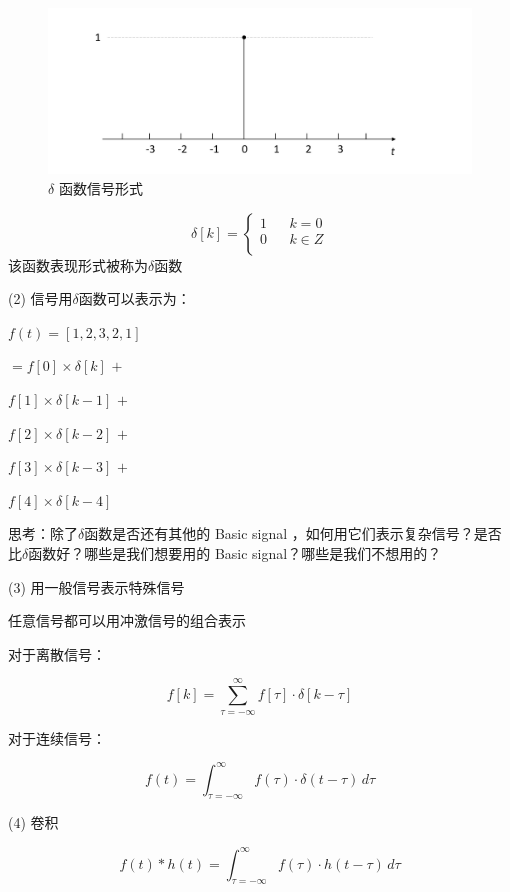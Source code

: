 \documentclass[UTF8]{ctexart}
\begin{document}
\begin{figure}[h]
    \centering         %
    \includegraphics[scale=0.4]{1.png}
    \caption{$\delta $ 函数信号形式}
\end{figure}
\[  \delta [ k] =\left\{ \begin{array}{rcl}
    1 & & {k =0}\\
    0 & & {k\in Z}\\
    \end{array} \right. \]
该函数表现形式被称为$\delta$函数\par
(2) \; 信号用$\delta$函数可以表示为：\par
$f(t)=[ 1,2,3,2,1]  $ \par
\qquad $=f[0]\times \delta [ k]  $ \quad \;  $+$\par
\qquad \quad $ f[1]\times \delta [ k-1]  $  $+$\par
\qquad \quad $ f[2]\times \delta [ k-2]  $  $+$\par
\qquad \quad $ f[3]\times \delta [ k-3]  $  $+$\par
\qquad \quad $ f[4]\times \delta [ k-4]  $  \par
思考：除了$\delta$函数是否还有其他的 Basic signal ，如何用它们表示复杂信号？是否比$\delta$函数好？哪些是我们想要用的 Basic signal？哪些是我们不想用的？\par
(3) \; 用一般信号表示特殊信号 \par
任意信号都可以用冲激信号的组合表示\par
对于离散信号：\par
\[ f[ k] =\sum_{\tau =-\infty}^{\infty} f[\tau  ]\cdot \delta [ k-\tau ]    \]\par
对于连续信号：\par
\[ f(t) =  \int_{\tau =-\infty}^{\infty} f(\tau )\cdot \delta (t-\tau  ) \,d\tau    \]
\; \par
\; \par
(4) \; 卷积 \par
\[ f(t)\ast h(t) =  \int_{\tau =-\infty}^{\infty} f(\tau )\cdot h (t-\tau  ) \,d\tau  \]\par
\end{document}
